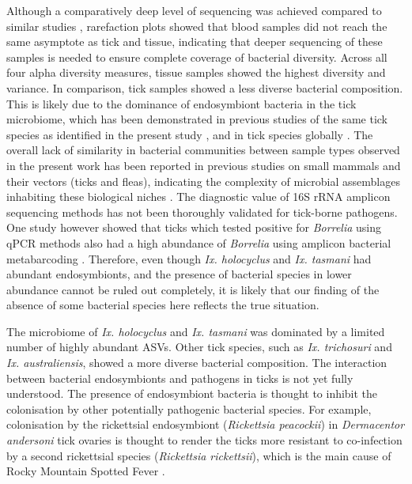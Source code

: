 \documentclass[a4paper, nobind]{templates/ociamthesis}
\begin{document}
Although a comparatively deep level of sequencing was achieved compared to similar studies \autocite{rynkiewiczConcordanceBacterialCommunities2015,geSpleenMicrobiotaSmall2018}, rarefaction plots showed that blood samples did not reach the same asymptote as tick and tissue, indicating that deeper sequencing of these samples is needed to ensure complete coverage of bacterial diversity.
Across all four alpha diversity measures, tissue samples showed the highest diversity and variance.
In comparison, tick samples showed a less diverse bacterial composition.
This is likely due to the dominance of endosymbiont bacteria in the tick microbiome, which has been demonstrated in previous studies of the same tick species as identified in the present study \autocite{goftonInhibitionEndosymbiontCandidatus2015,eganBacterialCommunityProfiling2020}, and in tick species globally \autocite{lalzarCompositionSeasonalVariation2012,gilIxodesScapularisMicrobiome2020}.
The overall lack of similarity in bacterial communities between sample types observed in the present work has been reported in previous studies on small mammals and their vectors (ticks and fleas), indicating the complexity of microbial assemblages inhabiting these biological niches \autocite{cohenSimilaritiesSeasonalVariations2015,rynkiewiczConcordanceBacterialCommunities2015,liStochasticProcessesGovern2018}.
The diagnostic value of 16S rRNA amplicon sequencing methods has not been thoroughly validated for tick-borne pathogens.
One study however showed that ticks which tested positive for \emph{Borrelia} using qPCR methods also had a high abundance of \emph{Borrelia} using amplicon bacterial metabarcoding \autocite{sperlingMicrobiomeCompositionBorrelia2020}.
Therefore, even though \emph{Ix. holocyclus} and \emph{Ix. tasmani} had abundant endosymbionts, and the presence of bacterial species in lower abundance cannot be ruled out completely, it is likely that our finding of the absence of some bacterial species here reflects the true situation.

The microbiome of \emph{Ix. holocyclus} and \emph{Ix. tasmani} was dominated by a limited number of highly abundant ASVs.
Other tick species, such as \emph{Ix. trichosuri} and \emph{Ix. australiensis}, showed a more diverse bacterial composition.
The interaction between bacterial endosymbionts and pathogens in ticks is not yet fully understood.
The presence of endosymbiont bacteria is thought to inhibit the colonisation by other potentially pathogenic bacterial species.
For example, colonisation by the rickettsial endosymbiont (\emph{Rickettsia peacockii}) in \emph{Dermacentor andersoni} tick ovaries is thought to render the ticks more resistant to co-infection by a second rickettsial species (\emph{Rickettsia rickettsii}), which is the main cause of Rocky Mountain Spotted Fever
\autocite{burgdorferNonpathogenicRickettsiaeDermacentor1981}
\autocite{burgdorferNonpathogenicRickettsiaeDermacentor1981,macalusoRickettsialInfectionDermacentor2002}.
\end{document}
